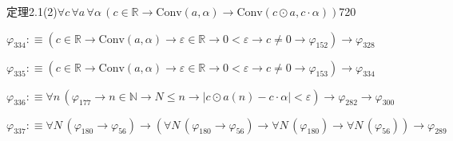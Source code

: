 \begin{fullproof}{定理2.1(2)}{$\forall c\,\forall a\,\forall \alpha\,(c \in \mathbb{R} \to \mathrm{Conv}(a,\alpha) \to \mathrm{Conv}(c \odot a,c \cdot \alpha))$}{720}
\begin{abbrevlist}
\item $\varphi_{334} :\equiv (c \in \mathbb{R} \to \mathrm{Conv}(a,\alpha) \to \varepsilon \in \mathbb{R} \to 0 < \varepsilon \to c \neq 0 \to \varphi_{152}) \to \varphi_{328}$
\item $\varphi_{335} :\equiv (c \in \mathbb{R} \to \mathrm{Conv}(a,\alpha) \to \varepsilon \in \mathbb{R} \to 0 < \varepsilon \to c \neq 0 \to \varphi_{153}) \to \varphi_{334}$
\item $\varphi_{336} :\equiv \forall n\,(\varphi_{177} \to n \in \mathbb{N} \to N \leq n \to \lvert c \odot a(n) - c \cdot \alpha \rvert < \varepsilon) \to \varphi_{282} \to \varphi_{300}$
\item $\varphi_{337} :\equiv \forall N\,(\varphi_{180} \to \varphi_{56}) \to (\forall N\,(\varphi_{180} \to \varphi_{56}) \to \forall N\,(\varphi_{180}) \to \forall N\,(\varphi_{56})) \to \varphi_{289}$
\end{abbrevlist}
\end{fullproof}
